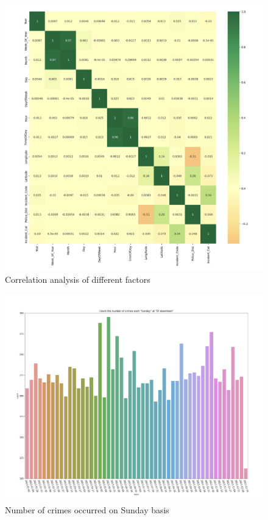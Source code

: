 \documentclass[conference,final,]{IEEEtran}
\begin{document}
\begin{figure}

{\centering \includegraphics[width=0.9\linewidth]{img/fig8} 

}

\caption{Correlation analysis of different factors}\label{fig:unnamed-chunk-8}
\end{figure}

\begin{figure}

{\centering \includegraphics[width=0.8\linewidth]{img/fig9} 

}

\caption{Number of crimes occurred on Sunday basis}\label{fig:unnamed-chunk-9}
\end{figure}
\end{document}
